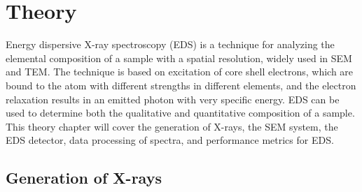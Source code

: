 \chapter{Theory}
\label{ch:theory}






Energy dispersive X-ray spectroscopy (EDS) is a technique for analyzing the elemental composition of a sample with a spatial resolution, widely used in SEM and TEM.
The technique is based on excitation of core shell electrons, which are bound to the atom with different strengths in different elements, and the electron relaxation results in an emitted photon with very specific energy.
EDS can be used to determine both the qualitative and quantitative composition of a sample.
This theory chapter will cover the generation of X-rays, the SEM system, the EDS detector, data processing of spectra, and performance metrics for EDS.



\section{Generation of X-rays}
\label{theory:xray_formation}



